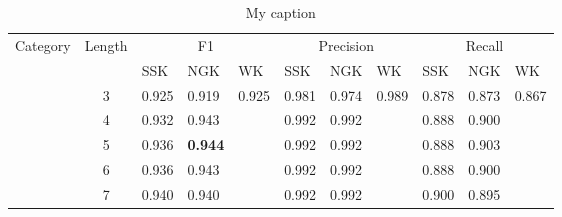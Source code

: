 \begin{table}[]
\centering
\caption{My caption}
\label{my-label}
\begin{tabular}{|c|c|l|l|l|l|l|l|l|l|l|}
\hline
Category               & Length                & \multicolumn{3}{c|}{F1}                                                                                         & \multicolumn{3}{c|}{Precision} & \multicolumn{3}{c|}{Recall}                                                                   \\ \cline{3-11} 
\multicolumn{1}{|l|}{} & \multicolumn{1}{l|}{} & SSK                                    & NGK                                    & WK                            & SSK      & NGK      & WK       & SSK                           & NGK                           & WK                            \\ \hline
                       & 3                     & \cellcolor[HTML]{EFEFEF}0.925          & \cellcolor[HTML]{EFEFEF}0.919          & \cellcolor[HTML]{EFEFEF}0.925 & 0.981    & 0.974    & 0.989    & \cellcolor[HTML]{EFEFEF}0.878 & \cellcolor[HTML]{EFEFEF}0.873 & \cellcolor[HTML]{EFEFEF}0.867 \\ \cline{2-11} 
                       & 4                     & \cellcolor[HTML]{EFEFEF}0.932          & \cellcolor[HTML]{EFEFEF}0.943          & \cellcolor[HTML]{EFEFEF}      & 0.992    & 0.992    &          & \cellcolor[HTML]{EFEFEF}0.888 & \cellcolor[HTML]{EFEFEF}0.900 & \cellcolor[HTML]{EFEFEF}      \\ \cline{2-11} 
                       & 5                     & \cellcolor[HTML]{EFEFEF}0.936          & \cellcolor[HTML]{EFEFEF}\textbf{0.944} & \cellcolor[HTML]{EFEFEF}      & 0.992    & 0.992    &          & \cellcolor[HTML]{EFEFEF}0.888 & \cellcolor[HTML]{EFEFEF}0.903 & \cellcolor[HTML]{EFEFEF}      \\ \cline{2-11} 
                       & 6                     & \cellcolor[HTML]{EFEFEF}0.936          & \cellcolor[HTML]{EFEFEF}0.943          & \cellcolor[HTML]{EFEFEF}      & 0.992    & 0.992    &          & \cellcolor[HTML]{EFEFEF}0.888 & \cellcolor[HTML]{EFEFEF}0.900 & \cellcolor[HTML]{EFEFEF}      \\ \cline{2-11} 
                       & 7                     & \cellcolor[HTML]{EFEFEF}0.940          & \cellcolor[HTML]{EFEFEF}0.940 	 & \cellcolor[HTML]{EFEFEF}      & 0.992    & 0.992    &          & \cellcolor[HTML]{EFEFEF}0.900 & \cellcolor[HTML]{EFEFEF}0.895 & \cellcolor[HTML]{EFEFEF}      \\ \cline{2-11} 

\end{tabular}
\end{table}
